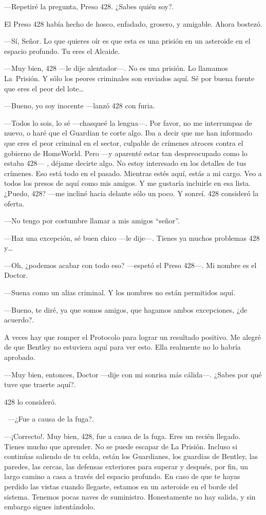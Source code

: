 ---Repetiré la pregunta, Preso 428. ¿Sabes quién soy?.

El Preso 428 había hecho de hosco, enfadado, grosero, y amigable. Ahora
bostezó.

---Sí, Señor. Lo que quieres oír es que esta es una prisión en un
asteroide en el espacio profundo. Tu eres el Alcaide.

---Muy bien, 428 ---le dije alentador---. No es una prisión. Lo llamamos
La~Prisión. Y sólo los peores criminales son enviados aquí. Sé por buena
fuente que eres el peor del lote\ldots{}

---Bueno, yo soy inocente ---lanzó 428 con furia.

---Todos lo sois, lo sé ---chasqueé la lengua---. Por favor, no me
interrumpas de nuevo, o haré que el Guardian te corte algo. Iba a decir
que me han informado que eres el peor criminal en el sector, culpable de
crímenes atroces contra el gobierno de HomeWorld. Pero ---y aparenté
estar tan despreocupado como lo estaba 428--- , déjame decirte algo. No
estoy interesado en los detalles de tus crímenes. Eso está todo en el
pasado. Mientras estés aquí, estás a mi cargo. Veo a todos los presos de
aquí como mis amigos. Y me gustaría incluirle en esa lista. ¿Puedo, 428?
---me incliné hacia delante sólo un poco. Y sonreí. 428 consideró la
oferta.

---No tengo por costumbre llamar a mis amigos ``señor''.

---Haz una excepción, sé buen chico ---le dije---. Tienes ya muchos
problemas 428 y\ldots{}

---Oh, ¿podemos acabar con todo eso? ---espetó el Preso 428---. Mi
nombre es el Doctor.

---Suena como un alias criminal. Y los nombres no están permitidos aquí.

---Bueno, te diré, ya que somos amigos, que hagamos ambos excepciones,
¿de acuerdo?.

A veces hay que romper el Protocolo para lograr un resultado positivo.
Me alegré de que Bentley no estuviera aquí para ver esto. Ella realmente
no lo habría aprobado.

---Muy bien, entonces, Doctor ---dije con mi sonrisa más cálida---.
¿Sabes por qué tuve que traerte aquí?.

428 lo consideró.

~---¿Fue a causa de la fuga?.

---¡Correcto!. Muy bien, 428, fue a causa de la fuga. Eres un recién
llegado. Tienes mucho que aprender. No se puede escapar de La Prisión.
Incluso si continúas saliendo de tu celda, están los Guardianes, los
guardias de Bentley, las paredes, las cercas, las defensas exteriores
para superar y después, por fin, un largo camino a casa a través del
espacio profundo. En caso de que te hayas perdido las vistas cuando
llegaste, estamos en un asteroide en el borde del sistema. Tenemos pocas
naves de suministro. Honestamente no hay salida, y sin embargo sigues
intentándolo.

